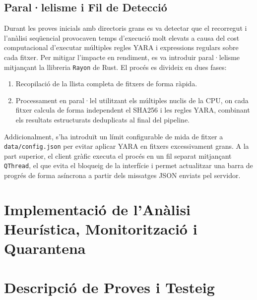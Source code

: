\documentclass[12pt,a4paper]{report}
\begin{document}
\subsection{Paral·lelisme i Fil de Detecció}
Durant les proves inicials amb directoris grans es va detectar que el recorregut i l'anàlisi seqüencial provocaven temps d'execució molt elevats a causa del cost computacional d'executar múltiples regles YARA i expressions regulars sobre cada fitxer. Per mitigar l'impacte en rendiment, es va introduir paral·lelisme mitjançant la llibreria \texttt{Rayon} de Rust. El procés es divideix en dues fases:
\begin{enumerate}
    \item Recopilació de la llista completa de fitxers de forma ràpida.
    \item Processament en paral·lel utilitzant els múltiples nuclis de la CPU, on cada fitxer calcula de forma independent el SHA256 i les regles YARA, combinant els resultats estructurats deduplicats al final del pipeline.
\end{enumerate}

Addicionalment, s'ha introduït un límit configurable de mida de fitxer a \texttt{data/config.json} per evitar aplicar YARA en fitxers excessivament grans. A la part superior, el client gràfic executa el procés en un fil separat mitjançant \texttt{QThread}, el que evita el bloqueig de la interfície i permet actualitzar una barra de progrés de forma asíncrona a partir dels missatges JSON enviats pel servidor.

\section{Implementació de l'Anàlisi Heurística, Monitorització i Quarantena}

\section{Descripció de Proves i Testeig}
\end{document}
